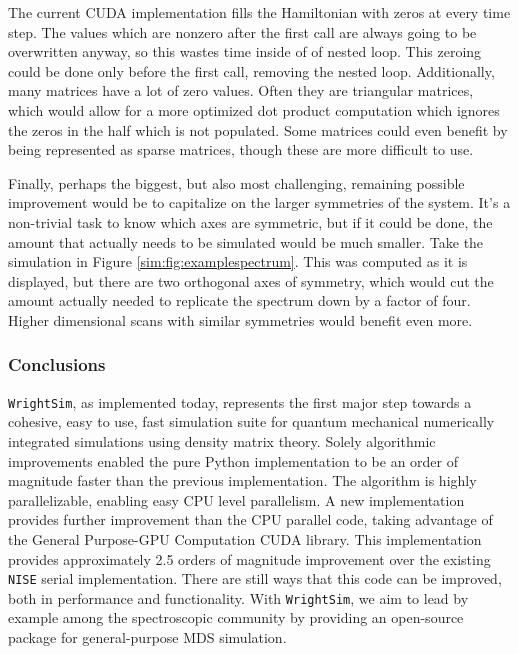 The current CUDA implementation fills the Hamiltonian with zeros at
every time step. The values which are nonzero after the first call are
always going to be overwritten anyway, so this wastes time inside of of
nested loop. This zeroing could be done only before the first call,
removing the nested loop. Additionally, many matrices have a lot of zero
values. Often they are triangular matrices, which would allow for a more
optimized dot product computation which ignores the zeros in the half
which is not populated. Some matrices could even benefit by being
represented as sparse matrices, though these are more difficult to use.

Finally, perhaps the biggest, but also most challenging, remaining
possible improvement would be to capitalize on the larger symmetries of
the system. It's a non-trivial task to know which axes are symmetric,
but if it could be done, the amount that actually needs to be simulated
would be much smaller. Take the simulation in Figure
\ref{sim:fig:examplespectrum}. This was computed as it is displayed, but
there are two orthogonal axes of symmetry, which would cut the amount
actually needed to replicate the spectrum down by a factor of four.
Higher dimensional scans with similar symmetries would benefit even
more.

\hypertarget{conclusions}{%
\subsubsection{Conclusions}\label{conclusions}}

\texttt{WrightSim}, as implemented today, represents the first major
step towards a cohesive, easy to use, fast simulation suite for quantum
mechanical numerically integrated simulations using density matrix
theory. Solely algorithmic improvements enabled the pure Python
implementation to be an order of magnitude faster than the previous
implementation. The algorithm is highly parallelizable, enabling easy
CPU level parallelism. A new implementation provides further improvement
than the CPU parallel code, taking advantage of the General Purpose-GPU
Computation CUDA library. This implementation provides approximately 2.5
orders of magnitude improvement over the existing \texttt{NISE} serial
implementation. There are still ways that this code can be improved,
both in performance and functionality. With \texttt{WrightSim}, we aim
to lead by example among the spectroscopic community by providing an
open-source package for general-purpose MDS simulation.


\clearpage
